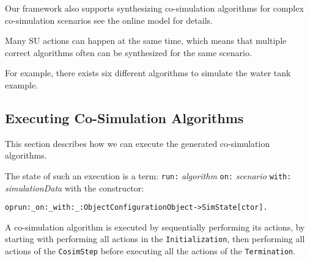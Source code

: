\begin{example}
\end{example}

Our framework also supports synthesizing co-simulation algorithms for complex co-simulation scenarios see the online model for details.

Many SU actions can happen at the same time, which means that multiple correct algorithms often can be synthesized for the same scenario.

For example, there exists six different algorithms to simulate the water tank example.

\subsection{Executing Co-Simulation Algorithms}
This section describes how we can execute the generated co-simulation algorithms.

The state of such an execution is a term: \texttt{run:} \emph{algorithm} \texttt{on:} \emph{scenario} \texttt{with:} \emph{simulationData} with the constructor:

\small
\begin{alltt}
op run:_on:_with:_ : Object Configuration Object -> SimState [ctor]. 
\end{alltt}
\normalsize

A co-simulation algorithm is executed by sequentially performing its actions, by starting with performing all actions in the \texttt{Initialization}, then performing all actions of the \texttt{CosimStep} before executing all the actions of the \texttt{Termination}. 

